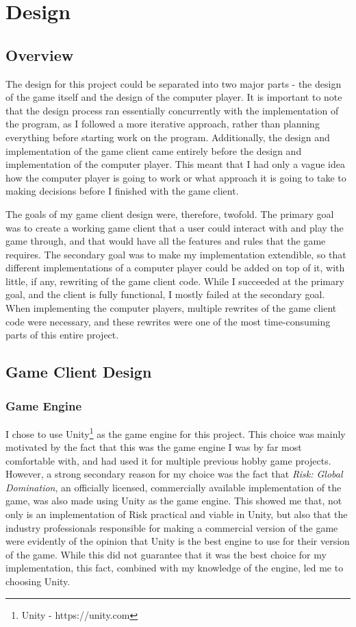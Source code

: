 \graphicspath{ {./Images/} }
\chapter{Design}
\section{Overview}
\label{overview}
The design for this project could be separated into two major parts - the design of the game itself and the design of the computer player. It is important to note that the design process ran essentially concurrently with the implementation of the program, as I followed a more iterative approach, rather than planning everything before starting work on the program. Additionally, the design and implementation of the game client came entirely before the design and implementation of the computer player. This meant that I had only a vague idea how the computer player is going to work or what approach it is going to take to making decisions before I finished with the game client.

The goals of my game client design were, therefore, twofold. The primary goal was to create a working game client that a user could interact with and play the game through, and that would have all the features and rules that the game requires. The secondary goal was to make my implementation extendible, so that different implementations of a computer player could be added on top of it, with little, if any, rewriting of the game client code. While I succeeded at the primary goal, and the client is fully functional, I mostly failed at the secondary goal. When implementing the computer players, multiple rewrites of the game client code were necessary, and these rewrites were one of the most time-consuming parts of this entire project.

\section{Game Client Design}
\label{gameClientDesign}
\subsection{Game Engine}
\label{gameEngine}
I chose to use Unity\footnote{Unity - https://unity.com} as the game engine for this project. This choice was mainly motivated by the fact that this was the game engine I was by far most comfortable with, and had used it for multiple previous hobby game projects. However, a strong secondary reason for my choice was the fact that \textit{Risk: Global Domination}, an officially licensed, commercially available implementation of the game, was also made using Unity as the game engine. This showed me that, not only is an implementation of Risk practical and viable in Unity, but also that the industry professionals responsible for making a commercial version of the game were evidently of the opinion that Unity is the best engine to use for their version of the game. While this did not guarantee that it was the best choice for my implementation, this fact, combined with my knowledge of the engine, led me to choosing Unity.

